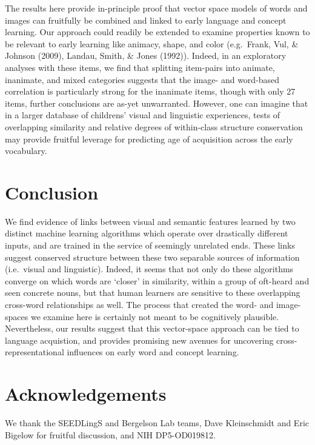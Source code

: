 \documentclass[10pt, letterpaper]{article}
\begin{document}
The results here provide in-principle proof that vector space models of
words and images can fruitfully be combined and linked to early language
and concept learning. Our approach could readily be extended to examine
properties known to be relevant to early learning like animacy, shape,
and color (e.g.~Frank, Vul, \& Johnson (2009), Landau, Smith, \& Jones
(1992)). Indeed, in an exploratory analyses with these items, we find
that splitting item-pairs into animate, inanimate, and mixed categories
suggests that the image- and word-based correlation is particularly
strong for the inanimate items, though with only 27 items, further
conclusions are as-yet unwarranted. However, one can imagine that in a
larger database of childrens' visual and linguistic experiences, tests
of overlapping similarity and relative degrees of within-class structure
conservation may provide fruitful leverage for predicting age of
acquisition across the early vocabulary.

\section{Conclusion}\label{conclusion}

We find evidence of links between visual and semantic features learned
by two distinct machine learning algorithms which operate over
drastically different inputs, and are trained in the service of
seemingly unrelated ends. These links suggest conserved structure
between these two separable sources of information (i.e.~visual and
linguistic). Indeed, it seems that not only do these algorithms converge
on which words are `closer' in similarity, within a group of oft-heard
and seen concrete nouns, but that human learners are sensitive to these
overlapping cross-word relationships as well. The process that created
the word- and image-spaces we examine here is certainly not meant to be
cognitively plausible. Nevertheless, our results suggest that this
vector-space approach can be tied to language acquistion, and provides
promising new avenues for uncovering cross-representational influences
on early word and concept learning.

\section{Acknowledgements}\label{acknowledgements}

We thank the SEEDLingS and Bergelson Lab teams, Dave Kleinschmidt and
Eric Bigelow for fruitful discussion, and NIH DP5-OD019812.
\end{document}
